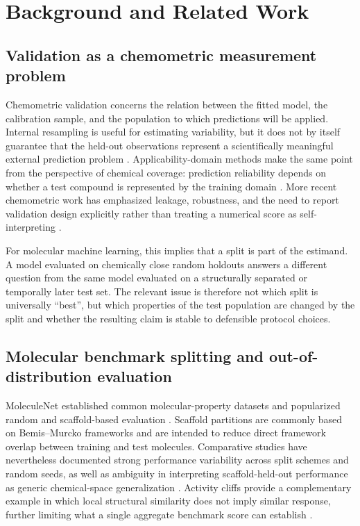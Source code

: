 \section{Background and Related Work}

\subsection{Validation as a chemometric measurement problem}

Chemometric validation concerns the relation between the fitted model, the calibration sample, and the population to which predictions will be applied. Internal resampling is useful for estimating variability, but it does not by itself guarantee that the held-out observations represent a scientifically meaningful external prediction problem \citep{esbensen2010proper,tropsha2003earnest,gramatica2007principles}. Applicability-domain methods make the same point from the perspective of chemical coverage: prediction reliability depends on whether a test compound is represented by the training domain \citep{netzeva2005applicability,sahigara2012applicability}. More recent chemometric work has emphasized leakage, robustness, and the need to report validation design explicitly rather than treating a numerical score as self-interpreting \citep{lasfar2024robustness,kiraly2025leakage,ezenarro2025validation,camacho2026validation}.

For molecular machine learning, this implies that a split is part of the estimand. A model evaluated on chemically close random holdouts answers a different question from the same model evaluated on a structurally separated or temporally later test set. The relevant issue is therefore not which split is universally ``best'', but which properties of the test population are changed by the split and whether the resulting claim is stable to defensible protocol choices.

\subsection{Molecular benchmark splitting and out-of-distribution evaluation}

MoleculeNet established common molecular-property datasets and popularized random and scaffold-based evaluation \citep{wu2018moleculenet}. Scaffold partitions are commonly based on Bemis--Murcko frameworks \citep{bemis1996properties} and are intended to reduce direct framework overlap between training and test molecules. Comparative studies have nevertheless documented strong performance variability across split schemes and random seeds, as well as ambiguity in interpreting scaffold-held-out performance as generic chemical-space generalization \citep{yang2019learned,deng2023systematic}. Activity cliffs provide a complementary example in which local structural similarity does not imply similar response, further limiting what a single aggregate benchmark score can establish \citep{vantilborg2022cliffs,jimenez2022attribution}.

